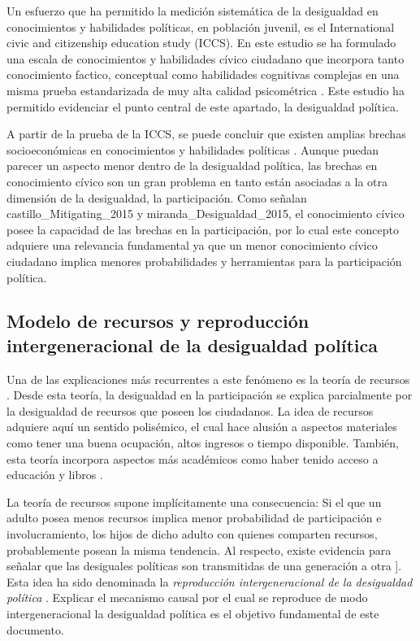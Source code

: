 \documentclass[12pt,twoside]{templates/facsothesis}
\begin{document}
Un esfuerzo que ha permitido la medición sistemática de la desigualdad en conocimientos y habilidades políticas, en población juvenil, es el International civic and citizenship education study (ICCS). En este estudio se ha formulado una escala de conocimientos y habilidades cívico ciudadano que incorpora tanto conocimiento factico, conceptual como habilidades cognitivas complejas en una misma prueba estandarizada de muy alta calidad psicométrica \citep{schulz_Initial_2010} . Este estudio ha permitido evidenciar el punto central de este apartado, la desigualdad política.

A partir de la prueba de la ICCS, se puede concluir que existen amplias brechas socioeconómicas en conocimientos y habilidades políticas \citep{ace_Informe_2018, schulz_Initial_2010, trevino_Influence_2017}. Aunque puedan parecer un aspecto menor dentro de la desigualdad política, las brechas en conocimiento cívico son un gran problema en tanto están asociadas a la otra dimensión de la desigualdad, la participación. Como señalan castillo\_Mitigating\_2015 y miranda\_Desigualdad\_2015, el conocimiento cívico posee la capacidad de las brechas en la participación, por lo cual este concepto adquiere una relevancia fundamental ya que un menor conocimiento cívico ciudadano implica menores probabilidades y herramientas para la participación política.

\hypertarget{modelo-de-recursos-y-reproducciuxf3n-intergeneracional-de-la-desigualdad-poluxedtica}{%
\subsection{Modelo de recursos y reproducción intergeneracional de la desigualdad política}\label{modelo-de-recursos-y-reproducciuxf3n-intergeneracional-de-la-desigualdad-poluxedtica}}

Una de las explicaciones más recurrentes a este fenómeno es la teoría de recursos \citep{schlozman_Unequal_2018}. Desde esta teoría, la desigualdad en la participación se explica parcialmente por la desigualdad de recursos que poseen los ciudadanos. La idea de recursos adquiere aquí un sentido polisémico, el cual hace alusión a aspectos materiales como tener una buena ocupación, altos ingresos o tiempo disponible. También, esta teoría incorpora aspectos más académicos como haber tenido acceso a educación y libros \citep{miranda_Desigualdad_2018}.

La teoría de recursos supone implícitamente una consecuencia: Si el que un adulto posea menos recursos implica menor probabilidad de participación e involucramiento, los hijos de dicho adulto con quienes comparten recursos, probablemente posean la misma tendencia. Al respecto, existe evidencia para señalar que las desiguales políticas son transmitidas de una generación a otra \citet{brady_Political_2015}{]}. Esta idea ha sido denominada la \emph{reproducción intergeneracional de la desigualdad política} \citep{miranda_Desigualdad_2018}. Explicar el mecanismo causal por el cual se reproduce de modo intergeneracional la desigualdad política es el objetivo fundamental de este documento.
\end{document}
